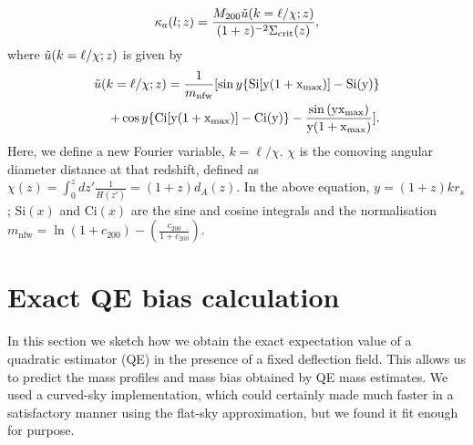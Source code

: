 \documentclass[prd, superscriptaddress, tightenlines, longbibliography, nofootinbib, eqsecnum, amsfonts, amsmath, floatfix, twocolumn, notitlepage]{revtex4-2}
\newcommand{\bs}[1]{\boldsymbol{#1}}
\begin{document}
\begin{equation}\label{eq:ft_anal1}
    \kappa_{a}(l;z) = \frac{M_{200}\Tilde{u}(k=\ell/\chi;z)}{(1+z)^{-2}\Sigma_{\text{crit}}(z)},
\end{equation}
where $\Tilde{u}(k=\ell/\chi;z)$ is given by
\begin{equation}\label{eq:ft_anal2}
	  \begin{split}
    \Tilde{u}(k=\ell/\chi;z) = \frac{1}{m_{\text{nfw}}}[\sin{y}\{\text{Si}[y(1+x_{\text{max}})] -\text{Si}(y)\} \\
    +\cos{y}\{ \text{Ci}[y(1+x_{\text{max}})]-\text{Ci}(y) \} - \frac{\sin{(y x_{\text{max}})}}{y(1+x_{\text{max}})}].
      \end{split}
\end{equation}
Here, we define a new Fourier variable, $k =\ell/\chi$. $\chi$ is the comoving angular diameter distance at that redshift, defined as $\chi(z) = \int_0^z dz'\frac{1}{H(z')} = (1+z)d_A(z)$. In the above equation, $y = (1+z)kr_s$; $\text{Si}(x)$ and $\text{Ci}(x)$ are the sine and cosine integrals and the normalisation $m_{\text{nfw}} = \ln{(1+c_{200})}-\left(\frac{c_{200}}{1+c_{200}}\right)$.




\section{Exact QE bias calculation}\label{A1}
\newcommand{\hn}[0]{\hat n}
In this section we sketch how we obtain the exact expectation value of a quadratic estimator (QE) in the presence of a fixed deflection field. This allows us to predict the mass profiles and mass bias obtained by QE mass estimates. We used a curved-sky implementation, which could certainly made much faster in a satisfactory manner using the flat-sky approximation, but we found it fit enough for purpose.
\end{document}
